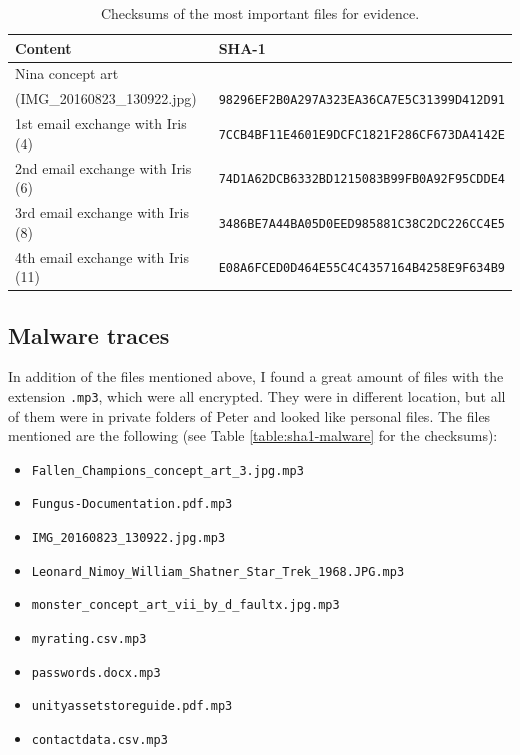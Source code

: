 \documentclass[12pt]{article}
\begin{document}
\begin{table}[!ht]
    \centering
    \begin{tabular}{ll}
    \toprule
        \textbf{Content} & \textbf{SHA-1} \\
        \midrule
        Nina concept art \\(IMG\_20160823\_130922.jpg) & \texttt{98296EF2B0A297A323EA36CA7E5C31399D412D91} \\
        1st email exchange with Iris (4) & \texttt{7CCB4BF11E4601E9DCFC1821F286CF673DA4142E} \\
        2nd email exchange with Iris (6) & \texttt{74D1A62DCB6332BD1215083B99FB0A92F95CDDE4} \\
        3rd email exchange with Iris (8) & \texttt{3486BE7A44BA05D0EED985881C38C2DC226CC4E5} \\
        4th email exchange with Iris (11) & \texttt{E08A6FCED0D464E55C4C4357164B4258E9F634B9} \\
    \bottomrule
    \end{tabular}
    \caption{Checksums of the most important files for evidence.}
    \label{table:sha1}
\end{table}

\subsection{Malware traces}

In addition of the files mentioned above, I found a great amount of files with the extension \texttt{.mp3}, which were all encrypted. They were in different location, but all of them were in private folders of Peter and looked like personal files.
The files mentioned are the following (see Table \ref{table:sha1-malware} for the checksums):
\begin{itemize} 
    \itemsep-0.5em 
    \item \texttt{Fallen\_Champions\_concept\_art\_3.jpg.mp3}
    \item \texttt{Fungus-Documentation.pdf.mp3}
    \item \texttt{IMG\_20160823\_130922.jpg.mp3}
    \item \texttt{Leonard\_Nimoy\_William\_Shatner\_Star\_Trek\_1968.JPG.mp3}
    \item \texttt{monster\_concept\_art\_vii\_by\_d\_faultx.jpg.mp3}
    \item \texttt{myrating.csv.mp3}
    \item \texttt{passwords.docx.mp3}
    \item \texttt{unityassetstoreguide.pdf.mp3}
    \item \texttt{contactdata.csv.mp3}
\end{itemize}
\end{document}

